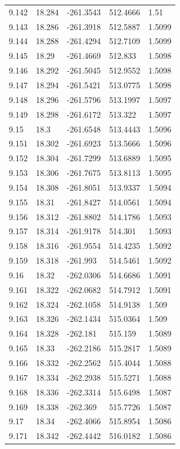 \begin{tabular}{lllll}
9.142 & 18.284 & -261.3543 & 512.4666 & 1.51 \\
9.143 & 18.286 & -261.3918 & 512.5887 & 1.5099 \\
9.144 & 18.288 & -261.4294 & 512.7109 & 1.5099 \\
9.145 & 18.29 & -261.4669 & 512.833 & 1.5098 \\
9.146 & 18.292 & -261.5045 & 512.9552 & 1.5098 \\
9.147 & 18.294 & -261.5421 & 513.0775 & 1.5098 \\
9.148 & 18.296 & -261.5796 & 513.1997 & 1.5097 \\
9.149 & 18.298 & -261.6172 & 513.322 & 1.5097 \\
9.15 & 18.3 & -261.6548 & 513.4443 & 1.5096 \\
9.151 & 18.302 & -261.6923 & 513.5666 & 1.5096 \\
9.152 & 18.304 & -261.7299 & 513.6889 & 1.5095 \\
9.153 & 18.306 & -261.7675 & 513.8113 & 1.5095 \\
9.154 & 18.308 & -261.8051 & 513.9337 & 1.5094 \\
9.155 & 18.31 & -261.8427 & 514.0561 & 1.5094 \\
9.156 & 18.312 & -261.8802 & 514.1786 & 1.5093 \\
9.157 & 18.314 & -261.9178 & 514.301 & 1.5093 \\
9.158 & 18.316 & -261.9554 & 514.4235 & 1.5092 \\
9.159 & 18.318 & -261.993 & 514.5461 & 1.5092 \\
9.16 & 18.32 & -262.0306 & 514.6686 & 1.5091 \\
9.161 & 18.322 & -262.0682 & 514.7912 & 1.5091 \\
9.162 & 18.324 & -262.1058 & 514.9138 & 1.509 \\
9.163 & 18.326 & -262.1434 & 515.0364 & 1.509 \\
9.164 & 18.328 & -262.181 & 515.159 & 1.5089 \\
9.165 & 18.33 & -262.2186 & 515.2817 & 1.5089 \\
9.166 & 18.332 & -262.2562 & 515.4044 & 1.5088 \\
9.167 & 18.334 & -262.2938 & 515.5271 & 1.5088 \\
9.168 & 18.336 & -262.3314 & 515.6498 & 1.5087 \\
9.169 & 18.338 & -262.369 & 515.7726 & 1.5087 \\
9.17 & 18.34 & -262.4066 & 515.8954 & 1.5086 \\
9.171 & 18.342 & -262.4442 & 516.0182 & 1.5086 \\

\end{tabular}
